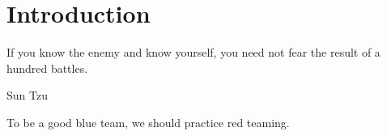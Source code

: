 \documentclass{article}
\begin{document}
\graphicspath{ {./Images/} }
\tableofcontents

\section{Introduction}
\epigraph{If you know the enemy and know yourself, you need not fear the result of a hundred battles.}{Sun Tzu}

To be a good blue team, we should practice red teaming.

\section{}
\end{document}
